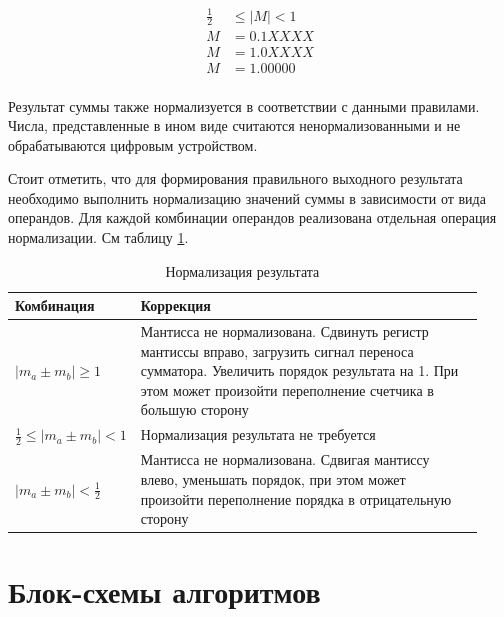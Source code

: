 \documentclass[a4paper,14pt]{extarticle}
\begin{document}
\begin{equation}
\begin{aligned}
\label{sign}
\frac12&\le \left|M\right|< 1\\
M &= 0.1XXXX\\
M &= 1.0XXXX\\
M&=1.00000\\
\end{aligned}
\end{equation}

Результат суммы также нормализуется в соответствии с данными правилами. Числа, представленные в ином виде считаются ненормализованными и не обрабатываются цифровым устройством.

Стоит отметить, что для формирования правильного выходного результата необходимо выполнить нормализацию значений суммы в зависимости от вида операндов. Для каждой комбинации операндов реализована отдельная операция нормализации. См таблицу \ref{tab:correction5}.

\begin{table}[h!]
	\small
	\begin{tabular}{|m{0.2\linewidth}|m{0.73\linewidth}|}
		\hline
		\textbf{Комбинация} &\textbf{Коррекция}\\
		\hline
		$\left|m_a\pm m_b\right|\ge1$ & Мантисса не нормализована. Сдвинуть регистр мантиссы вправо, загрузить сигнал переноса сумматора. Увеличить порядок результата на 1. При этом может произойти переполнение счетчика в большую сторону \\ 
		\hline
		$\frac12\le \left|m_a\pm m_b\right|< 1$ & Нормализация результата не требуется\\
		\hline
		$\left|m_a\pm m_b\right|<\frac12$ & Мантисса не нормализована. Сдвигая мантиссу влево, уменьшать порядок, при этом может произойти переполнение порядка в отрицательную сторону\\
		\hline
	\end{tabular}
	\caption{Нормализация результата}
	\label{tab:correction5}
\end{table}



\section{Блок-схемы алгоритмов}
\end{document}
